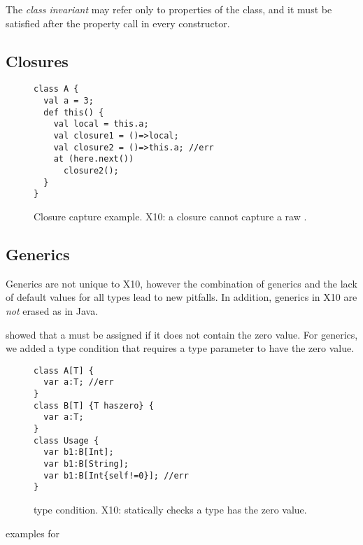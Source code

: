 The \emph{class invariant} may refer only to properties of the class,
    and it must be satisfied after the property call in every constructor.


\subsection{Closures}

\begin{figure}
\begin{lstlisting}
class A {
  val a = 3;
  def this() {
    val local = this.a;
    val closure1 = ()=>local;
    val closure2 = ()=>this.a; //err
    at (here.next())
      closure2();
  }
}
\end{lstlisting}
\caption{Closure capture \this example.
    X10: a closure cannot capture a raw \this.}
\label{Figure:Closures}
\end{figure}



\subsection{Generics}
Generics are not unique to X10,
    however the combination of generics and the lack of default values for all types
    lead to new pitfalls.
In addition, generics in X10 are \emph{not} erased as in Java.

 showed that a  must be assigned if
    it does not contain the zero value.
For generics, we added a  type condition that requires a type parameter to have the zero value.

\begin{figure}
\begin{lstlisting}
class A[T] {
  var a:T; //err
}
class B[T] {T haszero} {
  var a:T;
}
class Usage {
  var b1:B[Int];
  var b1:B[String];
  var b1:B[Int{self!=0}]; //err
}
\end{lstlisting}
\caption{ type condition.
    X10: statically checks a type has the zero value.}
\label{Figure:Generics}
\end{figure}


examples for 

